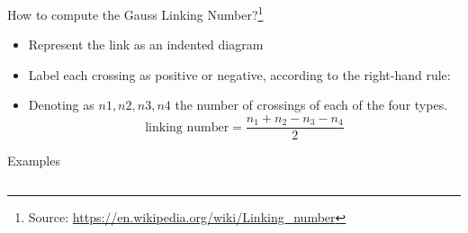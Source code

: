 \documentclass[beamer,10pt]{standalone}
\begin{document}
\begin{frame}{How to compute the Gauss Linking Number?\footnote{	Source: \url{https://en.wikipedia.org/wiki/Linking_number} }}
	\begin{itemize}
		\item Represent the link as an indented diagram
		\item Label each crossing as positive or negative, according to the right-hand rule:
  		
		\item Denoting as $n1, n2, n3, n4$ the number of crossings of each of the four types.
			$${\displaystyle {\text{linking number}}={\frac {n_{1}+n_{2}-n_{3}-n_{4}}{2}}}$$
	\end{itemize}
	\centering Examples
	\begin{columns}
		\begin{column}{.33\linewidth}	
		\end{column}
		\begin{column}{.33\linewidth}

\end{column}
\end{columns}
\end{frame}
\end{document}
